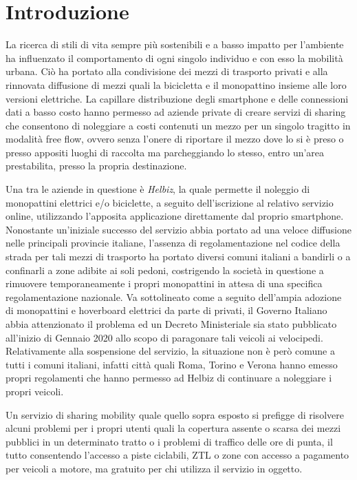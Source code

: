 \chapter{Introduzione}

La ricerca di stili di vita sempre più sostenibili e a basso impatto per
l'ambiente ha influenzato il comportamento di ogni singolo individuo e con esso
la mobilità urbana.
Ciò ha portato alla condivisione dei mezzi di trasporto privati e alla rinnovata
diffusione di mezzi quali la bicicletta e il monopattino insieme alle loro versioni
elettriche.
La capillare distribuzione degli smartphone e delle connessioni dati a basso costo
hanno permesso ad aziende private di creare servizi di sharing che consentono di 
noleggiare a costi contenuti un mezzo per un singolo tragitto in modalità free flow, ovvero
senza l'onere di riportare il mezzo dove lo si è preso o presso appositi luoghi
di raccolta ma parcheggiando lo stesso, entro un'area prestabilita, presso la
propria destinazione.

Una tra le aziende in questione è \emph{Helbiz}, la quale permette il noleggio di monopattini
elettrici e/o biciclette, a seguito dell'iscrizione al relativo servizio online,
utilizzando l'apposita applicazione direttamente dal proprio smartphone. Nonostante un'iniziale
successo del servizio abbia portato ad una veloce diffusione nelle principali provincie
italiane, l'assenza di regolamentazione nel codice della strada per tali mezzi di
trasporto ha portato diversi comuni italiani a bandirli o a confinarli a zone adibite
ai soli pedoni, costrigendo la società in questione a rimuovere temporaneamente i
propri monopattini in attesa di una specifica regolamentazione nazionale.
Va sottolineato come a seguito dell'ampia adozione di monopattini e hoverboard
elettrici da parte di privati, il Governo Italiano abbia attenzionato il problema
ed un Decreto Ministeriale sia stato pubblicato all'inizio di Gennaio 2020 allo
scopo di paragonare tali veicoli ai velocipedi.
Relativamente alla sospensione del servizio, la situazione non
è però comune a tutti i comuni italiani, infatti città quali Roma, Torino e Verona
hanno emesso propri regolamenti che hanno permesso ad Helbiz di continuare a
noleggiare i propri veicoli.

Un servizio di sharing mobility quale quello sopra esposto si prefigge di risolvere
alcuni problemi per i propri utenti quali la copertura assente o scarsa dei mezzi
pubblici in un determinato tratto o i problemi di traffico delle ore di punta, il tutto
consentendo l'accesso a piste ciclabili, ZTL o zone con accesso a pagamento per veicoli
a motore, ma gratuito per chi utilizza il servizio in oggetto.

